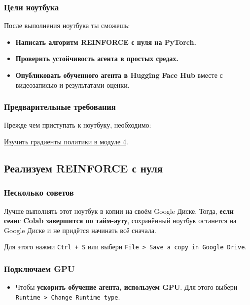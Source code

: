 \documentclass[11pt,a4paper]{article}
\begin{document}
\subsubsection{Цели ноутбука}\label{objectives-of-this-notebook}

После выполнения ноутбука ты сможешь:

\begin{itemize}
\tightlist
\item
  \textbf{Написать алгоритм REINFORCE с нуля на PyTorch.}
\item
  \textbf{Проверить устойчивость агента в простых средах.}
\item
  \textbf{Опубликовать обученного агента в Hugging Face Hub} вместе с видеозаписью и результатами оценки.
\end{itemize}

\subsubsection{Предварительные требования}\label{prerequisites}

Прежде чем приступать к ноутбуку, необходимо:

\href{https://huggingface.co/deep-rl-course/unit4/introduction}{Изучить градиенты политики в модуле 4}.

\subsection{Реализуем REINFORCE с нуля}\label{lets-code-reinforce-algorithm-from-scratch}

\subsubsection{Несколько советов}\label{some-advice-tip}

Лучше выполнять этот ноутбук в копии на своём Google Диске. Тогда, \textbf{если сеанс Colab завершится по тайм-ауту}, сохранённый ноутбук останется на Google Диске и не придётся начинать всё сначала.

Для этого нажми \texttt{Ctrl\ +\ S} или выбери \texttt{File\ \textgreater{}\ Save\ a\ copy\ in\ Google\ Drive}.

\subsubsection{Подключаем GPU}\label{set-the-gpu}

\begin{itemize}
\tightlist
\item
  Чтобы \textbf{ускорить обучение агента, используем GPU}. Для этого выбери \texttt{Runtime\ \textgreater{}\ Change\ Runtime\ type}.
\end{itemize}
\end{document}

